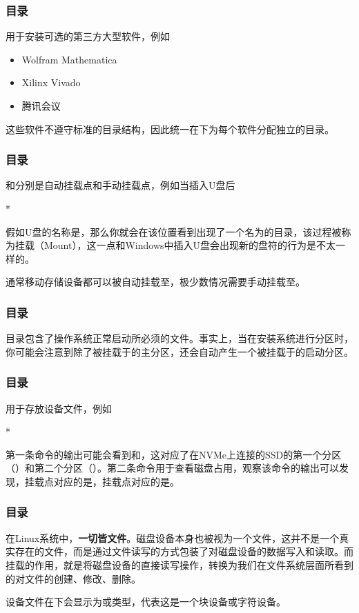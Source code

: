 \begin{frame}
    \frametitle{目录}
    用于安装可选的第三方大型软件，例如
    \begin{itemize}
        \item Wolfram Mathematica
        \item Xilinx Vivado
        \item 腾讯会议
    \end{itemize}
    这些软件不遵守标准的目录结构，因此统一在下为每个软件分配独立的目录。
\end{frame}

\begin{frame}
    \frametitle{目录}
    和分别是自动挂载点和手动挂载点，例如当插入U盘后
    \begin{Code}*
        
    \end{Code}
    假如U盘的名称是，那么你就会在该位置看到出现了一个名为的目录，该过程被称为挂载（Mount），这一点和Windows中插入U盘会出现新的盘符的行为是不太一样的。
    
    通常移动存储设备都可以被自动挂载至，极少数情况需要手动挂载至。
\end{frame}

\begin{frame}
    \frametitle{目录}
    目录包含了操作系统正常启动所必须的文件。事实上，当在安装系统进行分区时，你可能会注意到除了被挂载于\code{/}的主分区，还会自动产生一个被挂载于的启动分区。
\end{frame}

\begin{frame}
    \frametitle{目录}
    用于存放设备文件，例如
    \begin{Code}*
        
    \end{Code}
    第一条命令的输出可能会看到和，这对应了在NVMe上连接的SSD的第一个分区（）和第二个分区（）。第二条命令用于查看磁盘占用，观察该命令的输出可以发现，挂载点\code{/}对应的是，挂载点对应的是。
\end{frame}

\begin{frame}
    \frametitle{目录}
    在Linux系统中，\textbf{一切皆文件}。磁盘设备本身也被视为一个文件，这并不是一个真实存在的文件，而是通过文件读写的方式包装了对磁盘设备的数据写入和读取。而挂载的作用，就是将磁盘设备的直接读写操作，转换为我们在文件系统层面所看到的对文件的创建、修改、删除。

    设备文件在下会显示为或类型，代表这是一个块设备或字符设备。
\end{frame}

